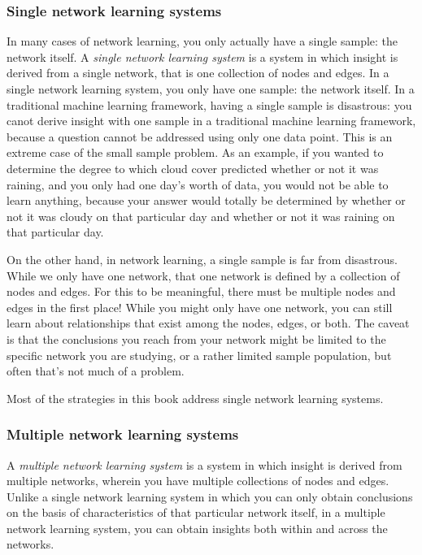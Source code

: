 \subsubsection{Single network learning systems}

In many cases of network learning, you only actually have a single sample: the network itself. A \textit{single network learning system} is a system in which insight is derived from a single network, that is one collection of nodes and edges. In a single network learning system, you only have one sample: the network itself. In a traditional machine learning framework, having a single sample is disastrous: you canot derive insight with one sample in a traditional machine learning framework, because a question cannot be addressed using only one data point. This is an extreme case of the small sample problem. As an example, if you wanted to determine the degree to which cloud cover predicted whether or not it was raining, and you only had one day's worth of data, you would not be able to learn anything, because your answer would totally be determined by whether or not it was cloudy on that particular day and whether or not it was raining on that particular day.

On the other hand, in network learning, a single sample is far from disastrous. While we only have one network, that one network is defined by a collection of nodes and edges. For this to be meaningful, there must be multiple nodes and edges in the first place! While you might only have one network, you can still learn about relationships that exist among the nodes, edges, or both. The caveat is that the conclusions you reach from your network might be limited to the specific network you are studying, or a rather limited sample population, but often that’s not much of a problem.


Most of the strategies in this book address single network learning systems.


\subsubsection{Multiple network learning systems}

A \textit{multiple network learning system} is a system in which insight is derived from multiple networks, wherein you have multiple collections of nodes and edges. Unlike a single network learning system in which you can only obtain conclusions on the basis of characteristics of that particular network itself, in a multiple network learning system, you can obtain insights {both} within and across the networks.


